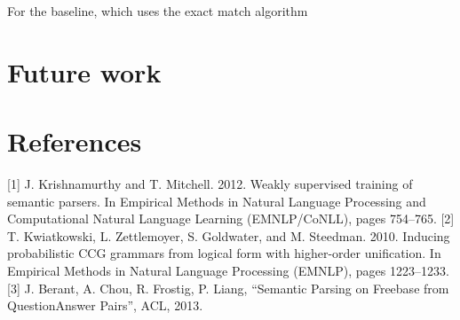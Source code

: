\documentclass[12pt, a4paper]{article}
\begin{document}
For the baseline, which uses the exact match algorithm




\section{Future work}

\section{References}
[1] J. Krishnamurthy and T. Mitchell. 2012. Weakly supervised training of semantic parsers. In Empirical Methods in Natural Language Processing and Computational Natural Language Learning (EMNLP/CoNLL), pages 754–765.
[2] T. Kwiatkowski, L. Zettlemoyer, S. Goldwater, and M. Steedman. 2010. Inducing probabilistic CCG grammars from logical form with higher-order unification. In Empirical Methods in Natural Language Processing (EMNLP), pages 1223–1233.
[3] J. Berant, A. Chou, R. Frostig, P. Liang, “Semantic Parsing on Freebase from QuestionAnswer Pairs”, ACL, 2013.
\end{document}
